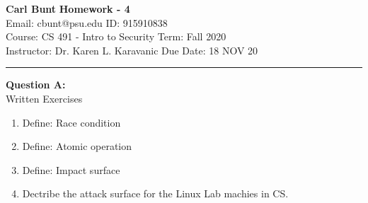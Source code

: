 \documentclass[a4paper, 11pt]{article}
\newenvironment{problem}[2][Question]
               { \begin{mdframed}[backgroundcolor=gray!20] \textbf{#1 #2:} \\}
               {   \end{mdframed}}
\begin{document}
 \noindent
 \large\textbf{Carl Bunt} \hfill \textbf{Homework - 4}   \\
 Email: cbunt@psu.edu \hfill ID: 915910838 \\
 \normalsize Course: CS 491 - Intro to Security \hfill Term: Fall 2020\\
 Instructor: Dr. Karen L. Karavanic \hfill Due Date: 18 NOV 20\\
 \noindent\rule{7in}{2.8pt}

 \begin{problem}{A}
   Written Exercises \\
   \begin{enumerate}[label=\arabic*.]
   \item
     Define: Race condition     
   \item
     Define: Atomic operation
   \item
     Define: Impact surface
   \item
     Dectribe the attack surface for the Linux Lab machies in CS.
   \end{enumerate}
 \end{problem}
\end{document}
